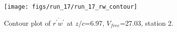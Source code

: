 \begin{figure}[H]
\centering
\texttt{[image: figs/run\_17/run\_17\_rw\_contour]}
\caption{Contour plot of $\overline{r^\prime w^\prime}$ at $z/c$=6.97, $V_{free}$=27.03, station 2.}
\label{fig:run_17_rw_contour}
\end{figure}


